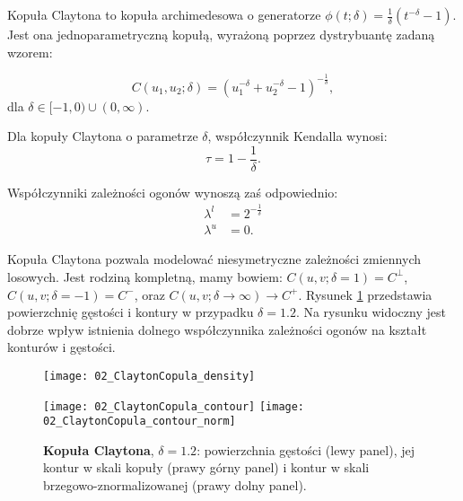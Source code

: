 \begin{df}
	Kopuła Claytona to kopuła archimedesowa o generatorze $\phi(t;\delta) = \frac{1}{\delta}(t^{-\delta}-1)$. Jest ona jednoparametryczną kopułą, wyrażoną poprzez dystrybuantę zadaną wzorem:
	
	$$ C(u_1, u_2; \delta) = (u_1 ^{-\delta} + u_2^{-\delta} - 1)^{-\frac{1}{\delta}},$$
	dla $\delta \in [-1, 0) \cup (0, \infty).$
\end{df}
\begin{prop}
	Dla kopuły Claytona o parametrze $\delta$, współczynnik Kendalla wynosi:
	$$ \tau = 1 - \frac{1}{\delta}.$$
	
	Współczynniki zależności ogonów wynoszą zaś odpowiednio:
	\begin{equation}
		\begin{split}
			\lambda^{l}&=2^{-\frac{1}{\delta}} \\
			\lambda^{u}&=0.
		\end{split}
	\end{equation}
\end{prop}
Kopuła Claytona pozwala modelować niesymetryczne zależności zmiennych losowych. Jest rodziną kompletną, mamy bowiem: $C(u,v;\delta = 1) = C^{\perp}$, $C(u,v;\delta = -1) = C^{-}$, oraz $C(u,v;\delta \to \infty) \to C^{+}$. Rysunek \ref{fig:clayton_copula_density} przedstawia powierzchnię gęstości i kontury w przypadku $\delta = 1.2$. Na rysunku widoczny jest dobrze wpływ istnienia dolnego współczynnika zależności ogonów na kształt konturów i gęstości.

\begin{figure}[h]
	\centering
	\begin{minipage}{0.5\linewidth}
		\texttt{[image: 02\_ClaytonCopula\_density]}
	\end{minipage}
	\begin{minipage}{0.45\linewidth}
		\texttt{[image: 02\_ClaytonCopula\_contour]}
		\texttt{[image: 02\_ClaytonCopula\_contour\_norm]}
	\end{minipage}
	\caption{\textbf{Kopuła Claytona}, $\delta = 1.2$: powierzchnia gęstości (lewy panel), jej kontur w skali kopuły (prawy górny panel) i kontur w skali brzegowo-znormalizowanej (prawy dolny panel). \label{fig:clayton_copula_density}}
\end{figure}

